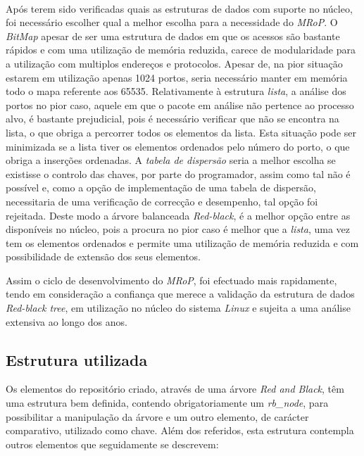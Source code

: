 \paragraph*{}

Após terem sido verificadas quais as estruturas de dados com suporte no núcleo, foi necessário escolher qual a melhor escolha para a necessidade do \textit{MRoP}.
O \textit{BitMap} apesar de ser uma estrutura de dados em que os acessos são bastante rápidos e com uma utilização de memória reduzida, carece de modularidade para a utilização com multiplos endereços e protocolos.
Apesar de, na pior situação estarem em utilização apenas 1024 portos, seria necessário manter em memória todo o mapa referente aos 65535.
Relativamente à estrutura \textit{lista}, a análise dos portos no pior caso, aquele em que o pacote em análise não pertence ao processo alvo, é bastante prejudicial, pois é necessário verificar que não se encontra na lista, o que obriga a percorrer todos os elementos da lista.
Esta situação pode ser minimizada se a lista tiver os elementos ordenados pelo número do porto, o que obriga a inserções ordenadas.
A \textit{tabela de dispersão} seria a melhor escolha se existisse o controlo das chaves, por parte do programador, assim como tal não é possível e, como a opção de implementação de uma tabela de dispersão, necessitaria de uma verificação de correcção e desempenho, tal opção foi rejeitada.  
Deste modo a árvore balanceada \textit{Red-black}, é a melhor opção entre as disponíveis no núcleo, pois a procura no pior caso é melhor que a \textit{lista}, uma vez tem os elementos ordenados e permite uma utilização de memória reduzida e com possibilidade de extensão dos seus elementos.


Assim o ciclo de desenvolvimento do \textit{MRoP}, foi efectuado mais rapidamente, tendo em consideração a confiança que merece a validação da estrutura de dados \textit{Red-black tree}, em utilização no núcleo do sistema \textit{Linux} e sujeita a uma análise extensiva ao longo dos anos.
 
\subsection{Estrutura utilizada}
\label{sub:repo_structure}

Os elementos do repositório criado, através de uma árvore \textit{Red and Black}, têm uma estrutura bem definida, contendo obrigatoriamente um \textit{rb\_node}, para possibilitar a manipulação da árvore e um outro elemento, de carácter comparativo, utilizado como chave.
Além dos referidos, esta estrutura contempla outros elementos que seguidamente se descrevem:

